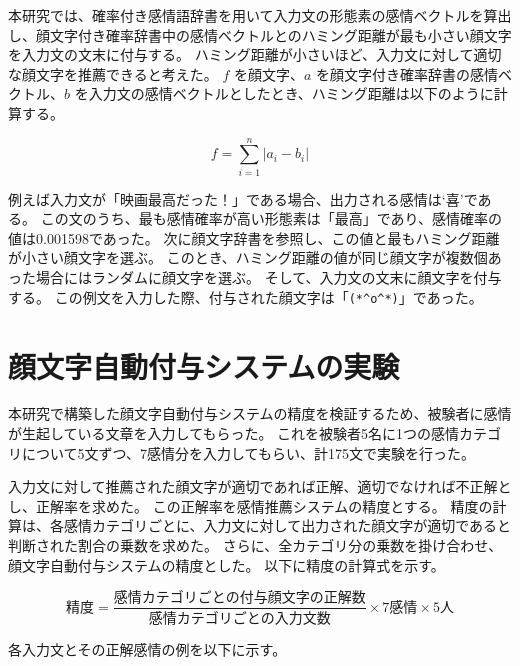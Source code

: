 \documentclass[11pt,a4j]{jsarticle}
\begin{document}
本研究では、確率付き感情語辞書を用いて入力文の形態素の感情ベクトルを算出し、顔文字付き確率辞書中の感情ベクトルとのハミング距離が最も小さい顔文字を入力文の文末に付与する。
ハミング距離が小さいほど、入力文に対して適切な顔文字を推薦できると考えた。
$f$ を顔文字、$a$ を顔文字付き確率辞書の感情ベクトル、$b$ を入力文の感情ベクトルとしたとき、ハミング距離は以下のように計算する。

\[
  f=\sum_{i=1}^{n} |a_i-b_i|
\]

例えば入力文が「映画最高だった！」である場合、出力される感情は`喜'である。
この文のうち、最も感情確率が高い形態素は「最高」であり、感情確率の値は0.001598であった。
次に顔文字辞書を参照し、この値と最もハミング距離が小さい顔文字を選ぶ。
このとき、ハミング距離の値が同じ顔文字が複数個あった場合にはランダムに顔文字を選ぶ。
そして、入力文の文末に顔文字を付与する。
この例文を入力した際、付与された顔文字は「\verb|(*^o^*)|」であった。

\section{顔文字自動付与システムの実験}\label{sec:experiment}
本研究で構築した顔文字自動付与システムの精度を検証するため、被験者に感情が生起している文章を入力してもらった。
これを被験者5名に1つの感情カテゴリについて5文ずつ、7感情分を入力してもらい、計175文で実験を行った。

入力文に対して推薦された顔文字が適切であれば正解、適切でなければ不正解とし、正解率を求めた。
この正解率を感情推薦システムの精度とする。
精度の計算は、各感情カテゴリごとに、入力文に対して出力された顔文字が適切であると判断された割合の乗数を求めた。
さらに、全カテゴリ分の乗数を掛け合わせ、顔文字自動付与システムの精度とした。
以下に精度の計算式を示す。

\[
  精度=\frac{感情カテゴリごとの付与顔文字の正解数}{感情カテゴリごとの入力文数} \times 7感情 \times 5人
\]

各入力文とその正解感情の例を以下に示す。
\end{document}
